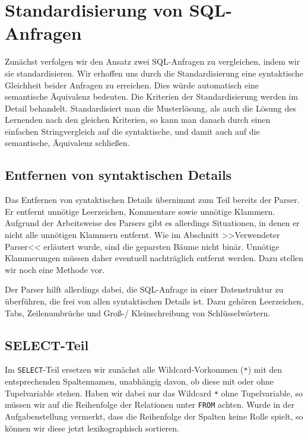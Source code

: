 \section{Standardisierung von SQL-Anfragen}

Zunächst verfolgen wir den Ansatz zwei SQL-Anfragen zu vergleichen, indem wir sie standardisieren. Wir erhoffen uns durch die Standardisierung eine syntaktische Gleichheit beider Anfragen zu erreichen. Dies würde automatisch eine semantische Äquivalenz bedeuten. Die Kriterien der Standardisierung werden im Detail behandelt. Standardisiert man die Musterlösung, als auch die Lösung des Lernenden nach den gleichen Kriterien, so kann man danach durch einen einfachen Stringvergleich auf die syntaktische, und damit auch auf die semantische, Äquivalenz schließen. 

\subsection{Entfernen von syntaktischen Details}

Das Entfernen von syntaktischen Details übernimmt zum Teil bereits der Parser. Er entfernt unnötige Leerzeichen, Kommentare sowie unnötige Klammern. Aufgrund der Arbeitsweise des Parsers gibt es allerdings Situationen, in denen er nicht alle unnötigen Klammern entfernt. Wie im Abschnitt >>Verwendeter Parser<< erläutert wurde, sind die geparsten Bäume nicht binär. Unnötige Klammerungen müssen daher eventuell nachträglich entfernt werden. Dazu stellen wir noch eine Methode vor.

Der Parser hilft allerdings dabei, die SQL-Anfrage in einer Datenstruktur zu überführen, die frei von allen syntaktischen Details ist. Dazu gehören Leerzeichen, Tabs, Zeilenumbrüche und Groß-/ Kleinschreibung von Schlüsselwörtern.


\subsection{SELECT-Teil}
\label{subsec:select}

Im \verb|SELECT|-Teil ersetzen wir zunächst alle Wildcard-Vorkommen (\verb|*|) mit den entsprechenden Spaltennamen, unabhängig davon, ob diese mit oder ohne Tupelvariable stehen. 
Haben wir dabei nur das Wildcard \verb|*| ohne Tupelvariable, so müssen wir auf die Reihenfolge der Relationen unter \verb|FROM| achten. Wurde in der Aufgabenstellung vermerkt, dass die Reihenfolge der Spalten keine Rolle spielt, so können wir diese jetzt lexikographisch sortieren. 


